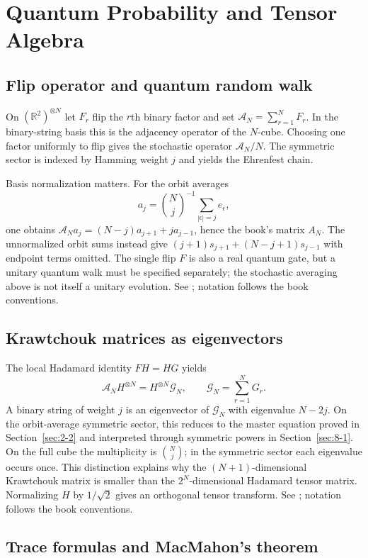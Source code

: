 \chapter{Quantum Probability and Tensor Algebra}
\label{ch:9}
\section{Flip operator and quantum random walk}
\label{sec:9-1}
On $(\mathbb R^2)^{\otimes N}$ let $F_r$ flip the $r$th binary factor
and set $\mathcal A_N=\sum_{r=1}^NF_r$. In the binary-string basis this
is the adjacency operator of the $N$-cube. Choosing one factor uniformly
to flip gives the stochastic operator $\mathcal A_N/N$.
The symmetric sector is indexed by Hamming weight $j$ and yields the
Ehrenfest chain.

Basis normalization matters. For the orbit averages
\[
a_j=\binom Nj^{-1}\sum_{|\epsilon|=j}e_\epsilon,
\]
one obtains $\mathcal A_Na_j=(N-j)a_{j+1}+ja_{j-1}$, hence the book's
matrix $A_N$. The unnormalized orbit sums instead give
$(j+1)s_{j+1}+(N-j+1)s_{j-1}$ with endpoint terms omitted.
The single flip $F$ is also a real quantum gate, but a unitary quantum
walk must be specified separately; the stochastic averaging above is
not itself a unitary evolution.
See \cite[Section~7]{KocikFeynman}; notation follows the book conventions.

\section{Krawtchouk matrices as eigenvectors}
\label{sec:9-2}
The local Hadamard identity $FH=HG$ yields
\[
\mathcal A_NH^{\otimes N}=H^{\otimes N}\mathcal G_N,\qquad
\mathcal G_N=\sum_{r=1}^NG_r.
\]
A binary string of weight $j$ is an eigenvector of $\mathcal G_N$ with
eigenvalue $N-2j$. On the orbit-average symmetric sector, this reduces to the master
equation proved in Section~\ref{sec:2-2} and interpreted through
symmetric powers in Section~\ref{sec:8-1}.
On the full cube the multiplicity is $\binom Nj$; in the symmetric sector
each eigenvalue occurs once. This distinction explains why the
$(N+1)$-dimensional Krawtchouk matrix is smaller than the $2^N$-dimensional
Hadamard tensor matrix. Normalizing $H$ by $1/\sqrt2$ gives an orthogonal
tensor transform.
See \cite[Section~7]{KocikFeynman}; notation follows the book conventions.

\section{Trace formulas and MacMahon's theorem}
\label{sec:9-3}

